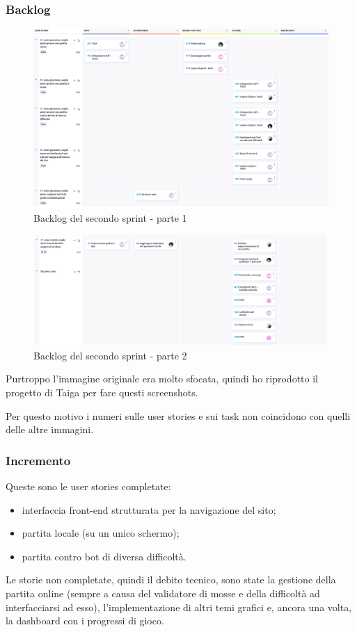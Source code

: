 \documentclass{article}
\begin{document}
\subsubsection{Backlog}
\begin{figure}[H]
    \centering
    \includegraphics[width=1\textwidth]{backlog2_1}
    \caption{Backlog del secondo sprint - parte 1}
    \label{fig:backlog2_1}
\end{figure}

\begin{figure}[H]
    \centering
    \includegraphics[width=1\textwidth]{backlog2_2}
    \caption{Backlog del secondo sprint - parte 2}
    \label{fig:backlog2}
\end{figure}

Purtroppo l'immagine originale era molto sfocata, quindi ho riprodotto il progetto di Taiga per fare questi screenshots.

Per questo motivo i numeri sulle user stories e sui task non coincidono con quelli delle altre immagini.

\subsubsection{Incremento}
Queste sono le user stories completate:
\begin{itemize}
    \item interfaccia front-end strutturata per la navigazione del sito;
    \item partita locale (su un unico schermo);
    \item partita contro bot di diversa difficoltà.
\end{itemize}
Le storie non completate, quindi il debito tecnico, sono state la gestione della partita online (sempre a causa del validatore
di mosse e della difficoltà ad interfacciarsi ad esso), l'implementazione di altri temi grafici e, ancora una volta, la dashboard
con i progressi di gioco.
\end{document}
